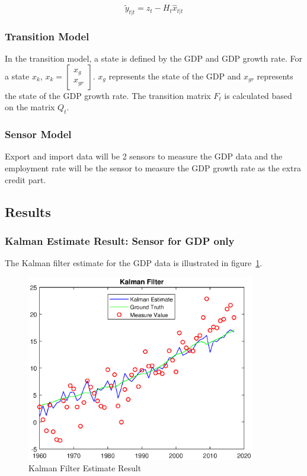 \documentclass[11pt, a4paper]{article}
\begin{document}
\begin{equation}
\widetilde{y}_{t|t} = z_t - H_t\widehat{x}_{t|t}
\end{equation}

\subsubsection{Transition Model}

In the transition model, a state is defined by the GDP and GDP growth rate. For a state $x_k$, $x_k = \begin{bmatrix} x_g \\ x_{gr}  \end{bmatrix}$. $x_g$ represents the state of the GDP and $x_{gr}$ represents the state of the GDP growth rate. The transition matrix $F_t$ is calculated based on the matrix $Q_t$.

\subsubsection{Sensor Model}

Export and import data will be 2 sensors to measure the GDP data and the employment rate will be the sensor to measure the GDP growth rate as the extra credit part. 


\subsection{Results}

\subsubsection{Kalman Estimate Result: Sensor for GDP only}

The Kalman filter estimate for the GDP data is illustrated in figure~\ref{fig:kf1}.

 \begin{figure}[htbp]
	
	\centering 
	\includegraphics[width=10cm]{kf_1}
	
	\caption{Kalman Filter Estimate Result}
	\label{fig:kf1}

\end{figure}
\end{document}
